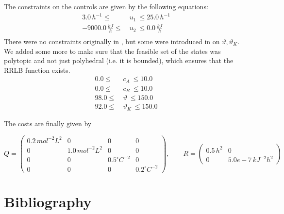 \documentclass[12pt]{article}
\begin{document}
\noindent The constraints on the controls are given by the following equations:
\begin{align*}
	3.0\,h^{-1}\leq &~u_1~ \leq 25.0\,h^{-1}\\
	-9000.0\,\frac{kJ}{h}\leq &~u_2~ \leq 0.0\,\frac{kJ}{h}\\
\end{align*}
There were no constraints originally in \cite{diehl-dissertation}, but some were introduced in \cite{cstr-ref} on $\vartheta,\vartheta_K$.
We added some more to make sure that the feasible set of the states was polytopic and not just polyhedral (i.e. it is bounded), which ensures that the RRLB function exists.
\begin{align*}
	0.0\leq&~c_A~\leq 10.0\\
	0.0\leq&~c_B~\leq 10.0\\
	98.0\leq &~\vartheta~\leq 150.0\\
	92.0\leq &~\vartheta_K~\leq 150.0
\end{align*}

\noindent The costs are finally given by

$$Q=\begin{pmatrix}
	0.2\,mol^{-2}L^2 & 0 & 0 & 0\\
	0 & 1.0\,mol^{-2}L^2 & 0 & 0\\
	0 & 0 & 0.5^\circ C^{-2} & 0\\
	0 & 0 & 0 & 0.2^\circ C^{-2}
\end{pmatrix},\qquad R=\begin{pmatrix}
	0.5\,h^{2} & 0\\
	0 & 5.0e-7\,kJ^{-2}h^2
\end{pmatrix}$$

\newpage

\section{Bibliography}

\printbibliography
\end{document}
